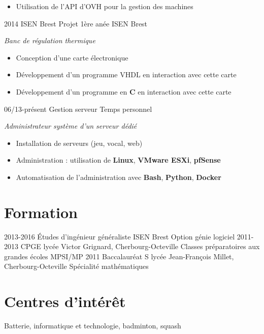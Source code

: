 \documentclass[]{friggeri-cv}
\begin{document}
\begin{entrylist}
{\begin{itemize}
      \item Utilisation de l'API d'OVH pour la gestion des machines
    \end{itemize}}
  \entry
    {2014}
    {ISEN Brest}
    {Projet 1ère anée ISEN Brest}
    {\emph{Banc de régulation thermique}
    \begin{itemize}
      \item Conception d'une carte électronique
      \item Développement d'un programme VHDL en interaction avec cette carte
      \item Développement d'un programme en \textbf{C} en interaction avec cette carte
    \end{itemize}}
  \entry
    {06/13-présent}
    { Gestion serveur}
    {Temps personnel}
    {\emph{Administrateur système d'un serveur dédié}
    \begin{itemize}
      \item Installation de serveurs (jeu, vocal, web)
      \item Administration : utilisation de \textbf{Linux}, \textbf{VMware ESXi}, \textbf{pfSense}
      \item Automatisation de l'administration avec \textbf{Bash}, \textbf{Python}, \textbf{Docker}
    \end{itemize}}
\end{entrylist}

\section{Formation}

\begin{entrylist}
  \entry
    {2013-2016}
    {Études d'ingénieur généraliste}
    {ISEN Brest}
    {Option génie logiciel}
  \entry
    {2011-2013}
    {CPGE}
    {lycée Victor Grignard, Cherbourg-Octeville}
    {Classes préparatoires aux grandes écoles MPSI/MP}
  \entry
    {2011}
    {Baccalauréat S}
    {lycée Jean-François Millet, Cherbourg-Octeville}
    {Spécialité mathématiques}
\end{entrylist}

\section{Centres d'intérêt}

Batterie, informatique et technologie, badminton, squash
\end{document}
